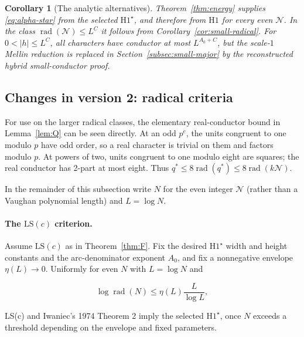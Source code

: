 \documentclass[11pt]{article}
\newtheorem{corollary}[theorem]{Corollary}
\theoremstyle{definition}
\DeclareMathOperator{\rad}{rad}
\newcommand{\GN}{\mathcal N}
\theoremstyle{remark}
\numberwithin{equation}{section}
\begin{document}
\begin{corollary}[The analytic alternatives]\label{cor:alternatives}
Theorem~\ref{thm:energy} supplies \eqref{eq:alpha-star} from the selected
$\mathrm H1^\star$, and therefore from $\mathrm H1$ for every even
$\GN$. In the class $\rad(\GN)\le L^C$ it follows from
Corollary~\ref{cor:small-radical}. For $0<|h|\le L^C$, all
characters have conductor at most $L^{A_0+C}$, but the scale-$1$
Mellin reduction is replaced in Section~\ref{subsec:small-major}
by the reconstructed hybrid small-conductor proof.
\end{corollary}

\subsection{Changes in version 2: radical criteria}\label{subsec:radical-v2}
For use on the larger radical classes, the elementary real-conductor
bound in Lemma~\ref{lem:Q} can be seen directly. At an odd
$p^e$, the units congruent to one modulo $p$ have odd order, so
a real character is trivial on them and factors modulo $p$.
At powers of two, units congruent to one modulo eight are squares;
the real conductor has 2-part at most eight. Thus
$q^*\le8\rad(q^*)\le8\rad(k\GN)$.

In the remainder of this subsection write $N$ for the even integer
$\GN$ (rather than a Vaughan polynomial length) and $L=\log N$.
\paragraph{The $\mathrm{LS}(c)$ criterion.}
Assume $\mathrm{LS}(c)$ as in Theorem~\ref{thm:F}. Fix the desired $\mathrm H1^\star$ width and height constants and the arc-denominator exponent $A_0$, and fix a nonnegative envelope $\eta(L)\to0$. Uniformly for even $N$ with $L=\log N$ and


\begin{equation}\label{v2:12-1}
\log\operatorname{rad}(N)\le\eta(L)\frac{L}{\log L},
\end{equation}


LS(c) and Iwaniec's 1974 Theorem 2 imply the selected $\mathrm H1^\star$, once $N$ exceeds a threshold depending on the envelope and fixed parameters.
\end{document}
